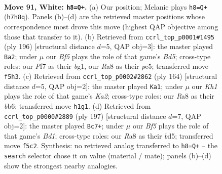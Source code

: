 \documentclass[11pt]{article}
\begin{document}
\clearpage

\begin{figure}[p]\centering
\begin{subfigure}{0.46\textwidth}\centering
\resizebox{\linewidth}{!}{%
\newchessgame
\chessboard[
  setfen={R7/5P1P/8/5B2/3k4/8/8/7K w - - 1 91},
  showmover=false,
  pgfstyle=straightmove, color=movearrow, markmove={h7-h8}
]}
\caption{}
\end{subfigure}\hfill
\begin{subfigure}{0.46\textwidth}\centering
\resizebox{\linewidth}{!}{%
\newchessgame
\chessboard[
  setfen={8/3k4/8/3Bp3/8/5P2/3K4/6b1 w - - 19 99},
  showmover=false,
  pgfstyle=straightmove, color=movearrow, markmove={d5-a2}
]}
\caption{}
\end{subfigure}
\\[4pt]
\begin{subfigure}{0.46\textwidth}\centering
\resizebox{\linewidth}{!}{%
\newchessgame
\chessboard[
  setfen={4B3/8/1b1k4/1P3p2/8/8/K7/8 w - - 13 83},
  showmover=false,
  pgfstyle=straightmove, color=movearrow, markmove={a2-a1}
]}
\caption{}
\end{subfigure}\hfill
\begin{subfigure}{0.46\textwidth}\centering
\resizebox{\linewidth}{!}{%
\newchessgame
\chessboard[
  setfen={3b4/8/1p6/1P1B4/8/6K1/8/6k1 b - - 12 99},
  showmover=false,
  pgfstyle=straightmove, color=movearrow, markmove={d8-c7}
]}
\caption{}
\end{subfigure}
\caption{\textbf{Move 91, White: \texttt{h8=Q+}.} (a) Our position; Melanie plays \texttt{h8=Q+} (\texttt{h7h8q}). Panels (b)--(d) are the retrieved master positions whose correspondence most drove this move (highest QAP objective among those that transfer to it). (b) Retrieved from \texttt{ccrl\_top\_p0001\#1495} (ply 196) [structural distance $d$=5, QAP obj=3]: the master played \texttt{Ba2}; under $\mu$ our \emph{Bf5} plays the role of that game's \emph{Bd5}; cross-type roles: our \emph{P}f7 as their \emph{b}g1, our \emph{R}a8 as their \emph{p}e5; transferred move \texttt{f5h3}. (c) Retrieved from \texttt{ccrl\_top\_p0002\#2862} (ply 164) [structural distance $d$=5, QAP obj=2]: the master played \texttt{Ka1}; under $\mu$ our \emph{Kh1} plays the role of that game's \emph{Ka2}; cross-type roles: our \emph{R}a8 as their \emph{b}b6; transferred move \texttt{h1g1}. (d) Retrieved from \texttt{ccrl\_top\_p0000\#2889} (ply 197) [structural distance $d$=7, QAP obj=2]: the master played \texttt{Bc7+}; under $\mu$ our \emph{Bf5} plays the role of that game's \emph{Bd1}; cross-type roles: our \emph{R}a8 as their \emph{b}d5; transferred move \texttt{f5c2}. Synthesis: no retrieved analog transferred to \texttt{h8=Q+} -- the \texttt{search} selector chose it on value (material / mate); panels (b)--(d) show the strongest nearby analogies.}
\label{fig:thought-m180}
\end{figure}
\end{document}
